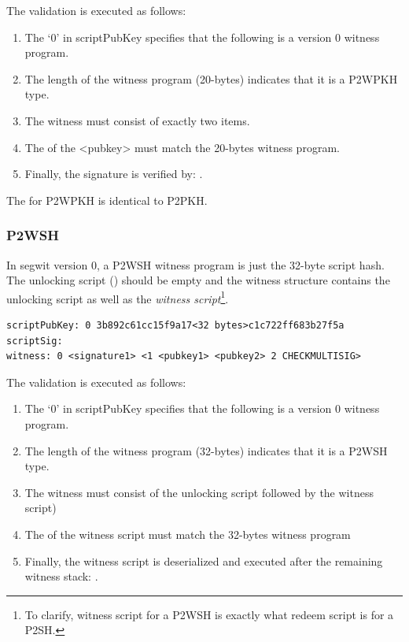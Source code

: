 The validation is executed as follows:
\begin{enumerate}
\item The `0' in scriptPubKey specifies that the following is a version 0 witness program.
\item The length of the witness program (20-bytes) indicates that it is a P2WPKH type.
\item The witness must consist of exactly two items.
\item The  of the <pubkey> must match the 20-bytes witness program.
\item Finally, the signature is verified by: .
\end{enumerate}

The  for P2WPKH is identical to P2PKH.


\subsubsection*{P2WSH}
In segwit version 0, a P2WSH witness program is just the 32-byte script hash. The unlocking script () should be empty and the witness structure contains the unlocking script as well as the \emph{witness script}\footnote{To clarify, witness script for a P2WSH is exactly what redeem script is for a P2SH.}.

\begin{emphbox}
\begin{lstlisting}[style=Pseudomath]
scriptPubKey: 0 3b892c61cc15f9a17<32 bytes>c1c722ff683b27f5a
scriptSig:
witness: 0 <signature1> <1 <pubkey1> <pubkey2> 2 CHECKMULTISIG>
\end{lstlisting}
\end{emphbox}

The validation is executed as follows:
\begin{enumerate}
\item The `0' in scriptPubKey specifies that the following is a version 0 witness program.
\item The length of the witness program (32-bytes) indicates that it is a P2WSH type.
\item The witness must consist of the unlocking script followed by the witness script) 
\item The  of the witness script must match the 32-bytes witness program
\item Finally, the witness script is deserialized and executed after the remaining witness stack: .
\end{enumerate}

